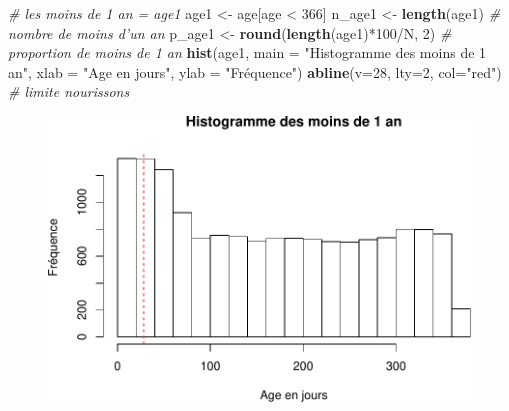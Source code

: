 \documentclass[]{article}
\newenvironment{Shaded}{\begin{snugshade}}{\end{snugshade}}
\newcommand{\KeywordTok}[1]{\textcolor[rgb]{0.13,0.29,0.53}{\textbf{{#1}}}}
\newcommand{\DataTypeTok}[1]{\textcolor[rgb]{0.13,0.29,0.53}{{#1}}}
\newcommand{\DecValTok}[1]{\textcolor[rgb]{0.00,0.00,0.81}{{#1}}}
\newcommand{\StringTok}[1]{\textcolor[rgb]{0.31,0.60,0.02}{{#1}}}
\newcommand{\CommentTok}[1]{\textcolor[rgb]{0.56,0.35,0.01}{\textit{{#1}}}}
\newcommand{\NormalTok}[1]{{#1}}
\begin{document}
\begin{Shaded}
\begin{Highlighting}[]
\CommentTok{# les moins de 1 an = age1}
\NormalTok{age1 <-}\StringTok{ }\NormalTok{age[age <}\StringTok{ }\DecValTok{366}\NormalTok{]}
\NormalTok{n_age1 <-}\StringTok{ }\KeywordTok{length}\NormalTok{(age1) }\CommentTok{# nombre de moins d'un an}
\NormalTok{p_age1 <-}\StringTok{ }\KeywordTok{round}\NormalTok{(}\KeywordTok{length}\NormalTok{(age1)*}\DecValTok{100}\NormalTok{/N, }\DecValTok{2}\NormalTok{) }\CommentTok{# proportion de moins de 1 an}
\KeywordTok{hist}\NormalTok{(age1, }\DataTypeTok{main =} \StringTok{"Histogramme des moins de 1 an"}\NormalTok{, }\DataTypeTok{xlab =} \StringTok{"Age en jours"}\NormalTok{, }\DataTypeTok{ylab =} \StringTok{"Fréquence"}\NormalTok{)}
\KeywordTok{abline}\NormalTok{(}\DataTypeTok{v=}\DecValTok{28}\NormalTok{, }\DataTypeTok{lty=}\DecValTok{2}\NormalTok{, }\DataTypeTok{col=}\StringTok{"red"}\NormalTok{) }\CommentTok{# limite nourissons}
\end{Highlighting}
\end{Shaded}

\begin{figure}[htbp]
\centering
\includegraphics{age_files/figure-latex/ped-2.pdf}
\end{figure}
\end{document}
